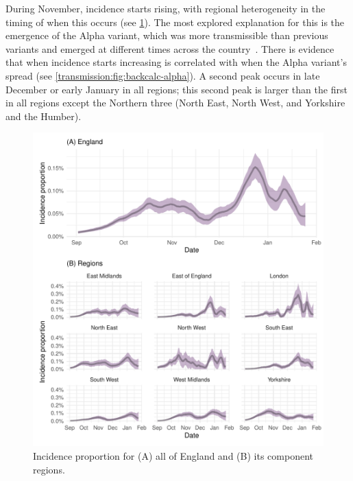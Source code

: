 \documentclass[thesis.tex]{subfiles}
\begin{document}
During November, incidence starts rising, with regional heterogeneity in the timing of when this occurs (see \cref{transmission:fig:backcalc-regions}).
The most explored explanation for this is the emergence of the Alpha variant, which was more transmissible than previous variants and emerged at different times across the country~\autocite{walkerTracking,daviesEstimated,lythgoeLineage}.
There is evidence that when incidence starts increasing is correlated with when the Alpha variant's spread (see \cref{transmission:fig:backcalc-alpha}).
A second peak occurs in late December or early January in all regions; this second peak is larger than the first in all regions except the Northern three (North East, North West, and Yorkshire and the Humber).
\begin{figure}
    \includegraphics{transmission/backcalc-regions}
    \caption[Incidence estimated using backcalculation by region]{%
        Incidence proportion for (A) all of England and (B) its component regions.
    }
    \label{transmission:fig:backcalc-regions}
\end{figure}
\end{document}
